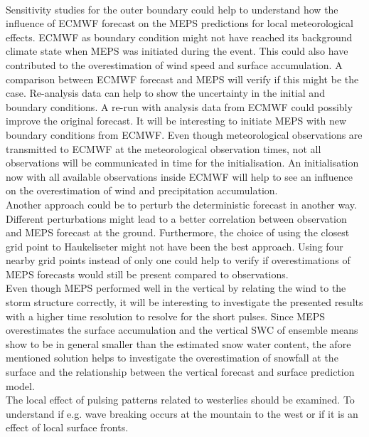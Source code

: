 \\
Sensitivity studies for the outer boundary could help to understand how the influence of ECMWF forecast on the MEPS predictions for local meteorological effects. ECMWF as boundary condition might not have reached its background climate state when MEPS was initiated during the event. This could also have contributed to the overestimation of wind speed and surface accumulation. A comparison between ECMWF forecast and MEPS will verify if this might be the case.
Re-analysis data can help to show the uncertainty in the initial and boundary conditions. A re-run with analysis data from ECMWF could possibly improve the original forecast. It will be interesting to initiate MEPS with new boundary conditions from ECMWF. Even though meteorological observations are transmitted to ECMWF at the meteorological observation times, not all observations will be communicated in time for the initialisation. An initialisation now with all available observations inside ECMWF will help to see an influence on the overestimation of wind and precipitation accumulation.
\\
Another approach could be to perturb the deterministic forecast in another way. Different perturbations might lead to a better correlation between observation and MEPS forecast at the ground. Furthermore, the choice of using the closest grid point to Haukeliseter might not have been the best approach. Using four nearby grid points instead of only one could help to verify if overestimations of MEPS forecasts would still be present compared to observations. 
\\
Even though MEPS performed well in the vertical by relating the wind to the storm structure correctly, it will be interesting to investigate the presented results with a higher time resolution to resolve for the short pulses. Since MEPS overestimates the surface accumulation and the vertical SWC of ensemble means show to be in general smaller than the estimated snow water content, the afore mentioned solution helps to investigate the overestimation of snowfall at the surface and the relationship between the vertical forecast and surface prediction model.
\\
The local effect of pulsing patterns related to westerlies should be examined. To understand if e.g. wave breaking occurs at the mountain to the west or if it is an effect of local surface fronts. 
